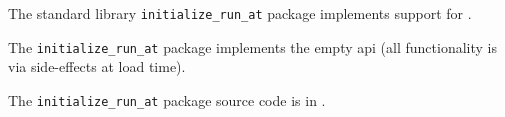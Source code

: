 
The standard library {\tt initialize\_run\_at} package implements support for .

The {\tt initialize\_run\_at} package implements the empty api (all functionality is via side-effects at load time).

The {\tt initialize\_run\_at} package source code is in .



